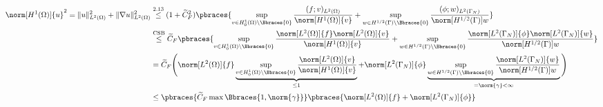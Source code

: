 \begin{solution}
\begin{enumerate}[label = (\roman*)]
    \begin{align*}
        \norm[H^1(\Omega)]{u}^2
        = \|u\|_{L^2(\Omega)}^2 + \|\nabla u\|_{L^2(\Omega)}^2
        & \stackrel{\text{2.13}}{\leq}
        (1 + \widetilde{C}_F^2)
        \pbraces
        {
            \sup_{v \in H_0^1(\Omega) \setminus \Bbraces{0}}
            \frac
            {
                (f; v)_{L^2(\Omega)}
            }{
                \norm[H^1(\Omega)]{v}
            }
            +
            \sup_{w \in H^{1/2}(\Gamma) \setminus \Bbraces{0}}
            \frac
            {
                (\phi; w)_{L^2(\Gamma_N)}
            }{
                \norm[H^{1/2}(\Gamma)]{w}
            }
        } \\
        & \stackrel{\text{CSB}}{\leq}
        \widetilde{C}_F
        \pbraces
        {
            \sup_{v \in H_0^1(\Omega) \setminus \Bbraces{0}}
            \frac
            {
                \norm[L^2(\Omega)]{f}
                \norm[L^2(\Omega)]{v}
            }{
                \norm[H^1(\Omega)]{v}
            }
            +
            \sup_{w \in H^{1/2}(\Gamma) \setminus \Bbraces{0}}
            \frac
            {
                \norm[L^2(\Gamma_N)]{\phi}
                \norm[L^2(\Gamma_N)]{w}
            }{
                \norm[H^{1/2}(\Gamma)]{w}
            }
        } \\
        & =
        \widetilde{C}_F
        \Bigg (
            \norm[L^2(\Omega)]{f}
            \underbrace
            {
                \sup_{v \in H_0^1(\Omega) \setminus \Bbraces{0}}
                \frac
                {
                    \norm[L^2(\Omega)]{v}
                }{
                    \norm[H^1(\Omega)]{v}
                }
            }_{
                \leq 1
            }
            +
            \norm[L^2(\Gamma_N)]{\phi}
            \underbrace
            {
                \sup_{w \in H^{1/2}(\Gamma) \setminus \Bbraces{0}}
                \frac
                {
                    \norm[L^2(\Gamma_N)]{w}
                }{
                    \norm[H^{1/2}(\Gamma)]{w}
                }
            }_{
                =
                \norm{\gamma}
                <
                \infty
            }
        \Bigg ) \\
        & \leq
        \pbraces
        {
            \widetilde{C}_F
            \max \Bbraces{1, \norm{\gamma}}
        }
        \pbraces
        {
            \norm[L^2(\Omega)]{f}
            +
            \norm[L^2(\Gamma_N)]{\phi}
        }
    \end{align*}


\end{enumerate}
\end{solution}
